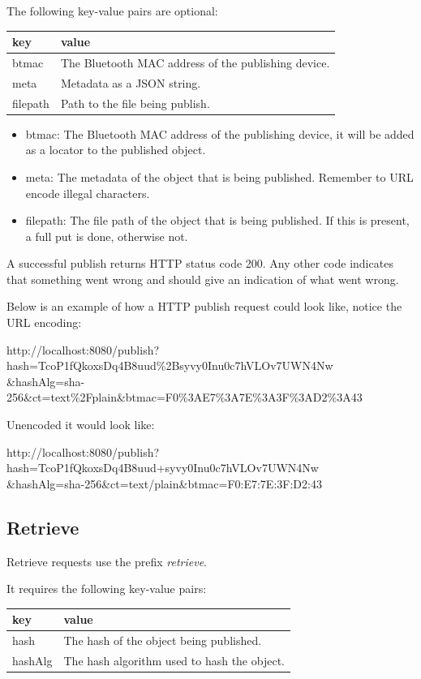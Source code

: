 The following key-value pairs are optional:

\begin{tabular}{ | l | l | }
	\hline
	key & value  \\ \hline \hline
	btmac & The Bluetooth MAC address of the publishing device. \\ \hline
	meta & Metadata as a JSON string. \\ \hline
	filepath & Path to the file being publish. \\ \hline
\end{tabular}

\begin{itemize}
	\item btmac: The Bluetooth MAC address of the publishing device, it will be added as a locator to the published object.
	\item meta: The metadata of the object that is being published. Remember to URL encode illegal characters.
	\item filepath: The file path of the object that is being published. If this is present, a full put is done, otherwise not.
 \end{itemize}

A successful publish returns HTTP status code 200. Any other code indicates that something went wrong and should give an indication of what went wrong.

Below is an example of how a HTTP publish request could look like, notice the URL encoding:

http://localhost:8080/publish?hash=TcoP1fQkoxsDq4B8uud\%2Bsyvy0Inu0c7hVLOv7UWN4Nw \\ \&hashAlg=sha-256\&ct=text\%2Fplain\&btmac=F0\%3AE7\%3A7E\%3A3F\%3AD2\%3A43

Unencoded it would look like:

http://localhost:8080/publish?hash=TcoP1fQkoxsDq4B8uud+syvy0Inu0c7hVLOv7UWN4Nw \\ \&hashAlg=sha-256\&ct=text/plain\&btmac=F0:E7:7E:3F:D2:43

\subsection{Retrieve}

Retrieve requests use the prefix \emph{retrieve}.

It requires the following key-value pairs:

\begin{tabular}{ | l | l | }
	\hline
	key & value  \\ \hline \hline
	hash & The hash of the object being published.  \\ \hline
	hashAlg & The hash algorithm used to hash the object. \\ \hline
\end{tabular}

